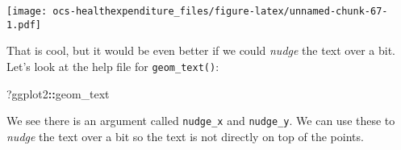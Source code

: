 \documentclass[]{article}
\newenvironment{Shaded}{\begin{snugshade}}{\end{snugshade}}
\newcommand{\DataTypeTok}[1]{\textcolor[rgb]{0.13,0.29,0.53}{#1}}
\newcommand{\KeywordTok}[1]{\textcolor[rgb]{0.13,0.29,0.53}{\textbf{#1}}}
\newcommand{\NormalTok}[1]{#1}
\newcommand{\OperatorTok}[1]{\textcolor[rgb]{0.81,0.36,0.00}{\textbf{#1}}}
\newcommand{\StringTok}[1]{\textcolor[rgb]{0.31,0.60,0.02}{#1}}
\begin{document}
\begin{Shaded}
\end{Shaded}

\texttt{[image: ocs-healthexpenditure\_files/figure-latex/unnamed-chunk-67-1.pdf]}

That is cool, but it would be even better if we could \emph{nudge} the
text over a bit. Let's look at the help file for \texttt{geom\_text()}:

\begin{Shaded}
\begin{Highlighting}[]
\NormalTok{?ggplot2}\OperatorTok{::}\NormalTok{geom_text}
\end{Highlighting}
\end{Shaded}

We see there is an argument called \texttt{nudge\_x} and
\texttt{nudge\_y}. We can use these to \emph{nudge} the text over a bit
so the text is not directly on top of the points.
\end{document}

